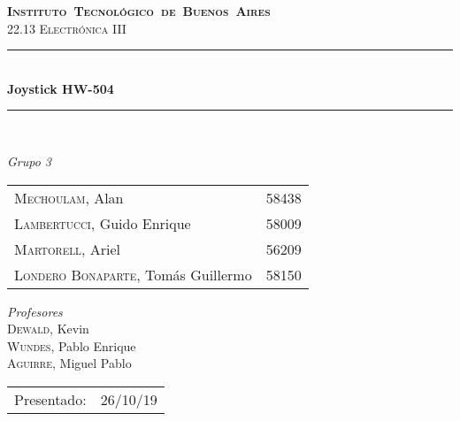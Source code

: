 \begin{titlepage}
\newcommand{\HRule}{\rule{\linewidth}{0.5mm}}
\center
\mbox{\textsc{\LARGE \bfseries {Instituto Tecnológico de Buenos Aires}}}\\[1.5cm]
\textsc{\Large 22.13 Electrónica III}\\[0.5cm]


\HRule \\[0.6cm]
{ \Huge \bfseries Joystick HW-504}\\[0.4cm] 
\HRule \\[1.5cm]


{\large

\emph{Grupo 3}\\
\vspace{3px}

\begin{tabular}{lr} 	
\textsc{Mechoulam}, Alan  &  58438\\
\textsc{Lambertucci}, Guido Enrique  & 58009 \\
\textsc{Martorell}, Ariel  & 56209 \\
\textsc{Londero Bonaparte}, Tomás Guillermo  & 58150 \\
\end{tabular}

\vspace{20px}

\emph{Profesores}\\
\vspace{3px}
\textsc{Dewald}, Kevin\\
\textsc{Wundes}, Pablo Enrique \\
\textsc{Aguirre}, Miguel Pablo \\	

\vspace{100px}

\begin{tabular}{ll}

Presentado: & 26/10/19\\

\end{tabular}

}

\vfill

\end{titlepage}
